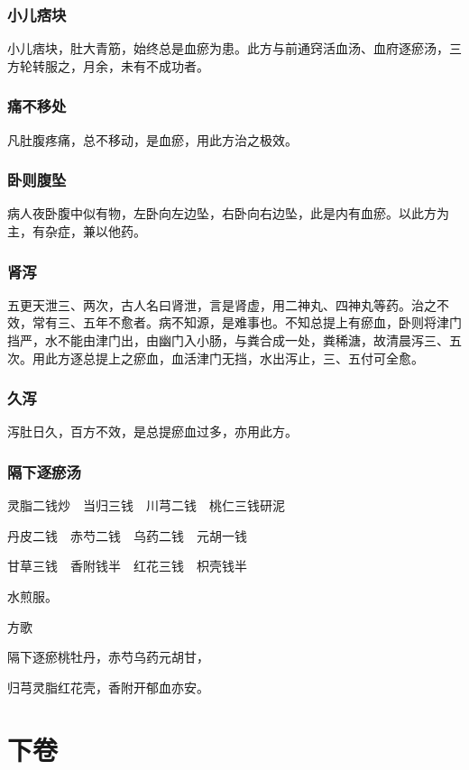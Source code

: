 \documentclass[a4paper,12pt,UTF8,twoside]{ctexbook}
\begin{document}
	\section{小儿痞块}
	小儿痞块，肚大青筋，始终总是血瘀为患。此方与前通窍活血汤、血府逐瘀汤，三方轮转服之，月余，未有不成功者。
	\section{痛不移处}
	凡肚腹疼痛，总不移动，是血瘀，用此方治之极效。
	\section{卧则腹坠}
	病人夜卧腹中似有物，左卧向左边坠，右卧向右边坠，此是内有血瘀。以此方为主，有杂症，兼以他药。
	\section{肾泻}
	五更天泄三、两次，古人名曰肾泄，言是肾虚，用二神丸、四神丸等药。治之不效，常有三、五年不愈者。病不知源，是难事也。不知总提上有瘀血，卧则将津门挡严，水不能由津门出，由幽门入小肠，与粪合成一处，粪稀溏，故清晨泻三、五次。用此方逐总提上之瘀血，血活津门无挡，水出泻止，三、五付可全愈。
	\section{久泻}
	泻肚日久，百方不效，是总提瘀血过多，亦用此方。
	\section{隔下逐瘀汤}
	
	
	灵脂二钱炒　当归三钱　川芎二钱　桃仁三钱研泥
	
	丹皮二钱　赤芍二钱　乌药二钱　元胡一钱
	
	甘草三钱　香附钱半　红花三钱　枳壳钱半
	
	水煎服。
	
	方歌
	
	隔下逐瘀桃牡丹，赤芍乌药元胡甘，
	
	归芎灵脂红花壳，香附开郁血亦安。
	
	\part{下卷}
\end{document}
